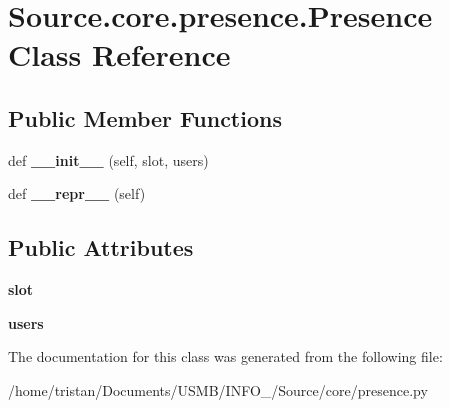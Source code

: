 \hypertarget{classSource_1_1core_1_1presence_1_1Presence}{}\section{Source.\+core.\+presence.\+Presence Class Reference}
\label{classSource_1_1core_1_1presence_1_1Presence}
\subsection*{Public Member Functions}
\begin{DoxyCompactItemize}
\item 
\mbox{\label{classSource_1_1core_1_1presence_1_1Presence_a5506dc5242f9fb6e27af5a07b2aecf80}} 
def {\bfseries \+\_\+\+\_\+init\+\_\+\+\_\+} (self, slot, users)
\item 
\mbox{\label{classSource_1_1core_1_1presence_1_1Presence_ae7309791615cbaf84bcb9d35aabf4908}} 
def {\bfseries \+\_\+\+\_\+repr\+\_\+\+\_\+} (self)
\end{DoxyCompactItemize}
\subsection*{Public Attributes}
\begin{DoxyCompactItemize}
\item 
\mbox{\label{classSource_1_1core_1_1presence_1_1Presence_ab0efc367b62008645e1db05a507d004b}} 
{\bfseries slot}
\item 
\mbox{\label{classSource_1_1core_1_1presence_1_1Presence_a0871b8495e93e6cb785fbbc4f396114d}} 
{\bfseries users}
\end{DoxyCompactItemize}


The documentation for this class was generated from the following file\+:\begin{DoxyCompactItemize}
\item 
/home/tristan/\+Documents/\+U\+S\+M\+B/\+I\+N\+F\+O\+\_/\+Source/core/presence.\+py\end{DoxyCompactItemize}
